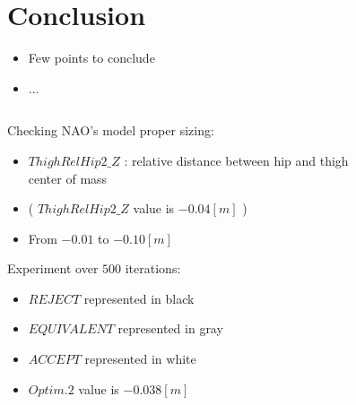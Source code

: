 \documentclass{beamer}
\begin{document}
\section{Conclusion}
\begin{frame}
  \begin{itemize}
  \item Few points to conclude
  \item ...
  \end{itemize}
\end{frame}

\begin{frame}
  \titlepage
\end{frame}

\begin{frame}
\begin{columns}
\begin{column}{.56\textwidth}
\footnotesize{Checking NAO's model proper sizing:
\begin{itemize}
\item $ThighRelHip2\_Z$ : relative distance between hip and thigh center of mass
\item ( $ThighRelHip2\_Z$ value is $-0.04[m]$ )
\item From $-0.01$ to $-0.10[m]$ 
\end{itemize}
Experiment over $500$ iterations:
\begin{itemize}
\item $REJECT$ represented in black
\item $EQUIVALENT$ represented in gray
\item $ACCEPT$ represented in white
\item $Optim.2$ value is $-0.038[m]$
\end{itemize}
}
\end{column}%
\hfill%
\begin{column}{.45\textwidth}
    \begin{figure}[!t]

\end{figure}
\end{column}
\end{columns}
\end{frame}
\end{document}
